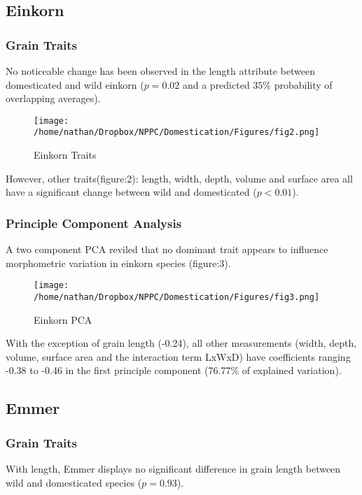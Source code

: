 \documentclass[a4paper, twocolumn]{article}
\begin{document}
\subsection{Einkorn}
\label{sec:org2052054}

\subsubsection{Grain Traits}
\label{sec:org2e61ab6}
No noticeable change has been observed in the length attribute between domesticated and wild einkorn (\(p=0.02\) and a predicted \(35\%\) probability of overlapping averages).

\begin{figure}[htbp]
\centering
\texttt{[image: /home/nathan/Dropbox/NPPC/Domestication/Figures/fig2.png]}
\caption{\label{fig:org23dd415}
Einkorn Traits}
\end{figure}

However, other traits(figure:2): length, width, depth, volume and surface area all have a significant change between wild and domesticated (\(p<0.01\)).

\clearpage

\subsubsection{Principle Component Analysis}
\label{sec:orgb162696}
A two component PCA reviled that no dominant trait appears to influence morphometric variation in einkorn species (figure:3).

\begin{figure}[htbp]
\centering
\texttt{[image: /home/nathan/Dropbox/NPPC/Domestication/Figures/fig3.png]}
\caption{\label{fig:orgae230ab}
Einkorn PCA}
\end{figure}

With the exception of grain length (-0.24), all other measurements (width, depth, volume, surface area and the interaction term LxWxD) have coefficients ranging -0.38 to -0.46 in the first principle component (76.77\% of explained variation).

\subsection{Emmer}
\label{sec:org5093020}

\subsubsection{Grain Traits}
\label{sec:org8f214b3}
With length, Emmer displays no significant difference in grain length between wild and domesticated species (\(p=0.93\)).
\end{document}

